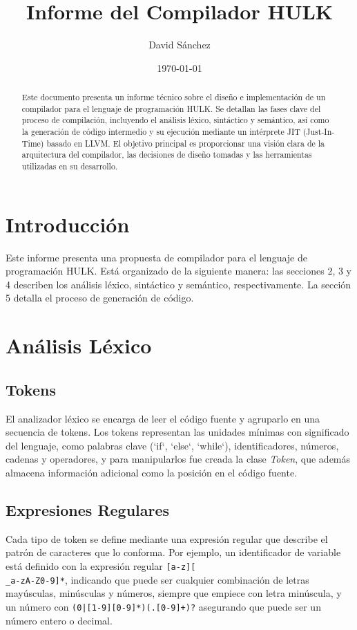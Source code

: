 \documentclass{article}
\title{Informe del Compilador HULK}
\author{David S\'anchez}
\date{\today}
\begin{document}
\maketitle

\begin{abstract}
    Este documento presenta un informe técnico sobre el diseño e implementación de un compilador para el lenguaje de programación HULK. Se detallan las fases clave del proceso de compilación, incluyendo el análisis léxico, sintáctico y semántico, así como la generación de código intermedio y su ejecución mediante un intérprete JIT (Just-In-Time) basado en LLVM. El objetivo principal es proporcionar una visión clara de la arquitectura del compilador, las decisiones de diseño tomadas y las herramientas utilizadas en su desarrollo.
\end{abstract}

\tableofcontents

\newpage

\section{Introducción}

    Este informe presenta una propuesta de compilador para el lenguaje de programación HULK. Está organizado de la siguiente manera: las secciones 2, 3 y 4 describen los análisis léxico, sintáctico y semántico, respectivamente. La sección 5 detalla el proceso de generación de código.

\section{Análisis Léxico}
    \subsection{Tokens}
    El analizador léxico se encarga de leer el código fuente y agruparlo en una secuencia de tokens. Los tokens representan las unidades mínimas con significado del lenguaje, como palabras clave (`if`, `else`, `while`), identificadores, números, cadenas y operadores, y para manipularlos fue creada la clase \textit{Token}, que además almacena información adicional como la posición en el código fuente.
    \subsection{Expresiones Regulares}
    Cada tipo de token se define mediante una expresión regular que describe el patrón de caracteres que lo conforma. Por ejemplo, un identificador de variable está definido con la expresión regular \texttt{[a-z][\\_a-zA-Z0-9]*}, indicando que puede ser cualquier combinación de letras mayúsculas, minúsculas y números, siempre que empiece con letra minúscula, y un número con \texttt{(0|[1-9][0-9]*)(.[0-9]+)?} asegurando que puede ser un número entero o decimal.
\end{document}
